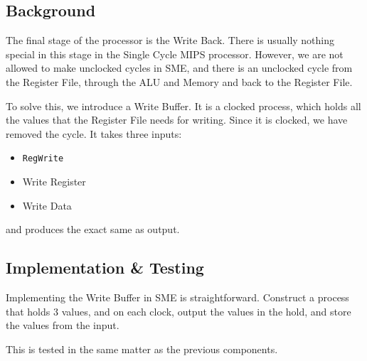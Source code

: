 \documentclass{beamer}
\begin{document}
\subsection{Background}
\begin{frame}
    The final stage of the processor is the Write Back. There is usually
    nothing special in this stage in the Single Cycle MIPS processor. However,
    we are not allowed to make unclocked cycles in SME, and there is an
    unclocked cycle from the Register File, through the ALU and Memory and back
    to the Register File.

    \vspace{\baselineskip}
    To solve this, we introduce a Write Buffer. It is a clocked process, which
    holds all the values that the Register File needs for writing. Since it is
    clocked, we have removed the cycle. It takes three inputs:
    \begin{itemize}
        \item \texttt{RegWrite}
        \item Write Register
        \item Write Data
    \end{itemize}
    and produces the exact same as output.
\end{frame}
\begin{frame}
    \begin{figure}
    \end{figure}
\end{frame}
\subsection{Implementation \& Testing}
\begin{frame}
    Implementing the Write Buffer in SME is straightforward. Construct a
    process that holds 3 values, and on each clock, output the values in the
    hold, and store the values from the input.

    \vspace{\baselineskip}
    This is tested in the same matter as the previous components.
\end{frame}
\end{document}
